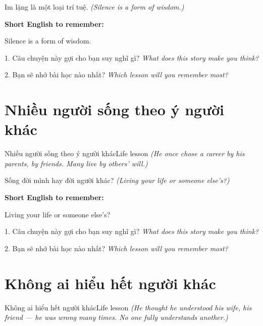 \begin{baihoc}
Im lặng là một loại trí tuệ.
\textit{(Silence is a form of wisdom.)}
\end{baihoc}

\begin{ghinhoanh}
\textbf{Short English to remember:}

Silence is a form of wisdom.

\end{ghinhoanh}

\begin{tuhocnhanh}
1. Câu chuyện này gợi cho bạn suy nghĩ gì? \textit{What does this story make you think?}

2. Bạn sẽ nhớ bài học nào nhất? \textit{Which lesson will you remember most?}
\end{tuhocnhanh}
\ngancach


\section{Nhiều người sống theo ý người khác}
\begin{truyen}{Nhiều người sống theo ý người khác}{Life lesson}
\textit{(He once chose a career by his parents, by friends. Many live by others' will.)}
\end{truyen}

\begin{baihoc}
Sống đời mình hay đời người khác?
\textit{(Living your life or someone else's?)}
\end{baihoc}

\begin{ghinhoanh}
\textbf{Short English to remember:}

Living your life or someone else's?

\end{ghinhoanh}

\begin{tuhocnhanh}
1. Câu chuyện này gợi cho bạn suy nghĩ gì? \textit{What does this story make you think?}

2. Bạn sẽ nhớ bài học nào nhất? \textit{Which lesson will you remember most?}
\end{tuhocnhanh}
\ngancach


\section{Không ai hiểu hết người khác}
\begin{truyen}{Không ai hiểu hết người khác}{Life lesson}
\textit{(He thought he understood his wife, his friend — he was wrong many times. No one fully understands another.)}
\end{truyen}

